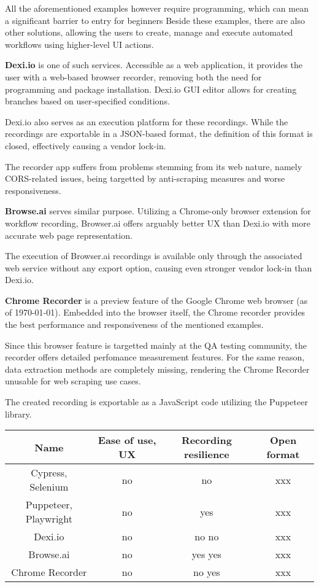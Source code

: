 \emptyline

All the aforementioned examples however require programming, which can mean a significant barrier to entry for beginners
Beside these examples, there are also other solutions, allowing the users to create, manage and execute automated workflows using higher-level UI actions.

\emptyline

\textbf{Dexi.io} is one of such services. 
Accessible as a web application, it provides the user with a web-based browser recorder, removing both the need for programming and package installation.
Dexi.io \ac{GUI} editor allows for creating branches based on user-specified conditions.

Dexi.io also serves as an execution platform for these recordings. 
While the recordings are exportable in a JSON-based format, the definition of this format is closed, effectively causing a vendor lock-in.

The recorder app suffers from problems stemming from its web nature, namely \acs{CORS}-related issues, being targetted by anti-scraping measures and worse responsiveness.

\textbf{Browse.ai} serves similar purpose. 
Utilizing a Chrome-only browser extension for workflow recording, Browser.ai offers arguably better \ac{UX} than Dexi.io with more accurate web page representation.

The execution of Browser.ai recordings is available only through the associated web service without any export option, causing even stronger vendor lock-in than Dexi.io.

\textbf{Chrome Recorder} is a preview feature of the Google Chrome web browser (as of \today).
Embedded into the browser itself, the Chrome recorder provides the best performance and responsiveness of the mentioned examples. 

Since this browser feature is targetted mainly at the \ac{QA} testing community, the recorder offers detailed perfomance measurement features.
For the same reason, data extraction methods are completely missing, rendering the Chrome Recorder unusable for web scraping use cases.

The created recording is exportable as a JavaScript code utilizing the Puppeteer library.

\begin{center}
    \begin{tabular}{ c | c | c | c }
    Name & Ease of use, \ac{UX} & Recording resilience & Open format \\
    \hline\hline
        Cypress, Selenium & no & no & xxx \\
        Puppeteer, Playwright & no & yes & xxx \\
        Dexi.io & no & no no & xxx \\
        Browse.ai & no & yes yes & xxx \\
        Chrome Recorder & no & no yes & xxx \\
    \end{tabular}
\end{center}